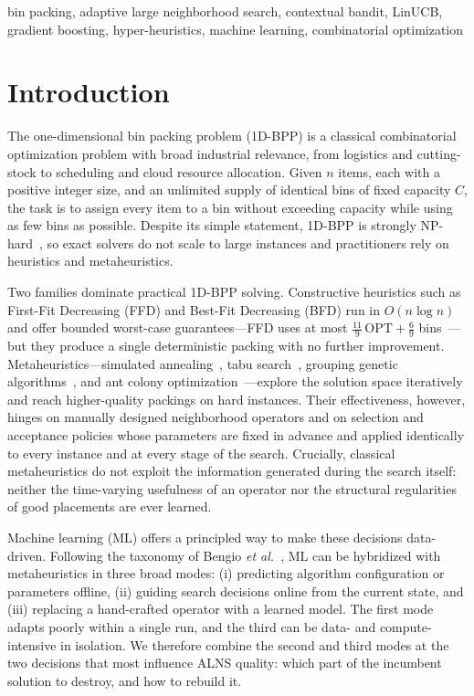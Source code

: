\documentclass[conference]{IEEEtran}
\begin{document}
\begin{IEEEkeywords}
	bin packing, adaptive large neighborhood search, contextual bandit, LinUCB,
	gradient boosting, hyper-heuristics, machine learning, combinatorial optimization
\end{IEEEkeywords}

\section{Introduction}\label{sec:intro}

The one-dimensional bin packing problem (1D-BPP) is a classical combinatorial
optimization problem with broad industrial relevance, from logistics and
cutting-stock to scheduling and cloud resource allocation. Given $n$ items, each
with a positive integer size, and an unlimited supply of identical bins of fixed
capacity $C$, the task is to assign every item to a bin without exceeding capacity
while using as few bins as possible. Despite its simple statement, 1D-BPP is
strongly NP-hard~\cite{bGarey}, so exact solvers do not scale to large instances
and practitioners rely on heuristics and metaheuristics.

Two families dominate practical 1D-BPP solving. Constructive heuristics such as
First-Fit Decreasing (FFD) and Best-Fit Decreasing (BFD) run in $O(n\log n)$ and
offer bounded worst-case guarantees---FFD uses at most $\tfrac{11}{9}\,\mathrm{OPT}+\tfrac{6}{9}$
bins~\cite{bJohnson}---but they produce a single deterministic packing with no
further improvement. Metaheuristics---simulated annealing~\cite{bKirkpatrick},
tabu search~\cite{bGlover}, grouping genetic algorithms~\cite{bFalkenauer}, and
ant colony optimization~\cite{bDorigo}---explore the solution space iteratively
and reach higher-quality packings on hard instances. Their effectiveness,
however, hinges on manually designed neighborhood operators and on
selection and acceptance policies whose parameters are fixed in advance and
applied identically to every instance and at every stage of the search.
Crucially, classical metaheuristics do not exploit the information generated
during the search itself: neither the time-varying usefulness of an operator nor
the structural regularities of good placements are ever learned.

Machine learning (ML) offers a principled way to make these decisions
data-driven. Following the taxonomy of Bengio \textit{et al.}~\cite{bBengio}, ML
can be hybridized with metaheuristics in three broad modes: (i) predicting
algorithm configuration or parameters offline, (ii) guiding search decisions
online from the current state, and (iii) replacing a hand-crafted operator with a
learned model. The first mode adapts poorly within a single run, and the third
can be data- and compute-intensive in isolation. We therefore combine the second
and third modes at the two decisions that most influence ALNS quality: which part
of the incumbent solution to destroy, and how to rebuild it.
\end{document}

